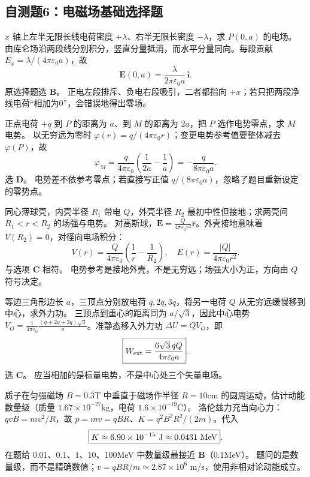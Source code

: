 \subsection{自测题6：电磁场基础选择题}

\problemtext $x$ 轴上左半无限长线电荷密度 $+\lambda$、右半无限长密度 $-\lambda$，求 $P(0,a)$ 的电场。
\workings 由库仑场沿两段线分别积分，竖直分量抵消，而水平分量同向。每段贡献 $E_x=\lambda/(4\pi\varepsilon_0a)$，故
\[\boxed{\bm E(0,a)=\frac{\lambda}{2\pi\varepsilon_0a}\,\bm i}.\]
原选择题选 \textbf{B}。
\crosscheck 正电左段排斥、负电右段吸引，二者都指向 $+x$；若只把两段净线电荷“相加为0”，会错误地得出零场。

\problemtext 正点电荷 $+q$ 到 $P$ 的距离为 $a$、到 $M$ 的距离为 $2a$，把 $P$ 选作电势零点，求 $M$ 电势。
\workings 以无穷远为零时 $\varphi(r)=q/(4\pi\varepsilon_0r)$；变更电势参考值要整体减去 $\varphi(P)$，故
\[\boxed{\varphi_M=\frac{q}{4\pi\varepsilon_0}\left(\frac1{2a}-\frac1a\right)=-\frac{q}{8\pi\varepsilon_0 a}}.\]
选 \textbf{D}。
\crosscheck 电势差不依参考零点；若直接写正值 $q/(8\pi\varepsilon_0a)$，忽略了题目重新设定的零势点。

\problemtext 同心薄球壳，内壳半径 $R_1$ 带电 $Q$，外壳半径 $R_2$ 最初中性但接地；求两壳间 $R_1<r<R_2$ 的场强与电势。
\workings 对高斯球，$\bm E=\frac{Q}{4\pi\varepsilon_0r^2}\hat{\bm r}$。外壳接地意味着 $V(R_2)=0$，对径向电场积分：
\[\boxed{V(r)=\frac{Q}{4\pi\varepsilon_0}\left(\frac1r-\frac1{R_2}\right)},\quad \boxed{E(r)=\frac{|Q|}{4\pi\varepsilon_0r^2}}.\]
与选项 \textbf{C} 相符。
\crosscheck 电势参考是接地外壳，不是无穷远；场强大小为正，方向由 $Q$ 符号决定。

\problemtext 等边三角形边长 $a$，三顶点分别放电荷 $q,2q,3q$，将另一电荷 $Q$ 从无穷远缓慢移到中心，求外力功。
\workings 三顶点到重心的距离同为 $a/\sqrt3$，因此中心电势 $V_O=\frac{1}{4\pi\varepsilon_0}\frac{(q+2q+3q)\sqrt3}{a}$。准静态移入外力功 $\Delta U=QV_O$，即
\[\boxed{W_{\rm ext}=\frac{6\sqrt3\,qQ}{4\pi\varepsilon_0a}}.\]
选 \textbf{C}。
\crosscheck 应当相加的是标量电势，不是中心处三个矢量电场。

\problemtext 质子在匀强磁场 $B=0.3$T 中垂直于磁场作半径 $R=10$cm 的圆周运动，估计动能数量级（质量 $1.67\times10^{-27}$kg，电荷 $1.6\times10^{-19}$C）。
\workings 洛伦兹力充当向心力：$qvB=mv^2/R$，故 $p=mv=qBR$、$K=q^2B^2R^2/(2m)$。代入
\[\boxed{K\approx6.90\times10^{-15}\ {\rm J}\approx0.0431\ {\rm MeV}}.\]
在题给 $0.01$、$0.1$、$1$、$10$、$100$MeV 中数量级最接近 \textbf{B}（$0.1$MeV）。
\crosscheck 题问的是数量级，而不是精确数值；$v=qBR/m\simeq2.87\times10^6$ m/s，使用非相对论动能成立。

